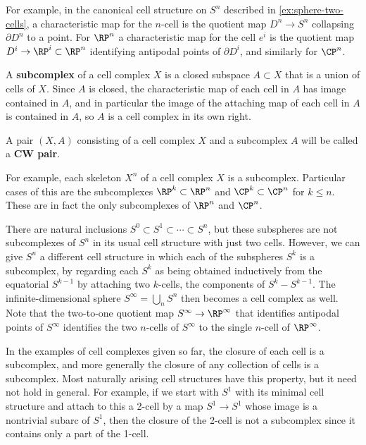 For example, in the canonical cell structure on $S^n$ described in
\cref{ex:sphere-two-cells}, a characteristic map for the $n$-cell is the quotient map
$D^n \to S^n$ collapsing $\partial D^n$ to a point. For $\RP^n$ a characteristic map for the cell
$e^i$ is the quotient map $D^i \to \RP^i \subset \RP^n$ identifying antipodal points of
$\partial D^i$, and similarly for $\CP^n$.

\begin{definition}[Subcomplex]
\label{def:subcomplex}
\mathlibok
{}
A \textbf{subcomplex} of a cell complex $X$ is a closed subspace $A \subset X$ that is a
union of cells of $X$. Since $A$ is closed, the characteristic map of each cell in $A$ has
image contained in $A$, and in particular the image of the attaching map of each cell
in $A$ is contained in $A$, so $A$ is a cell complex in its own right.
\end{definition}

\begin{definition}[CW pair]
\label{def:cw-pair}
\mathlibok
{}
A pair $(X,A)$ consisting of a cell complex $X$ and a subcomplex $A$ will be
called a \textbf{CW pair}.
\end{definition}

For example, each skeleton $X^n$ of a cell complex $X$ is a subcomplex. Particular
cases of this are the subcomplexes $\RP^k \subset \RP^n$ and $\CP^k \subset \CP^n$ for $k \le n$. These
are in fact the only subcomplexes of $\RP^n$ and $\CP^n$.

There are natural inclusions $S^0 \subset S^1 \subset \cdots \subset S^n$, but these subspheres
are not subcomplexes of $S^n$ in its usual cell structure with just two cells. However, we
can give $S^n$ a different cell structure in which each of the subspheres $S^k$ is a
subcomplex, by regarding each $S^k$ as being obtained inductively from the equatorial
$S^{k-1}$ by attaching two $k$-cells, the components of $S^k - S^{k-1}$. The infinite-dimensional
sphere $S^\infty = \bigcup_n S^n$ then becomes a cell complex as well. Note that the two-to-one
quotient map $S^\infty \to \RP^\infty$ that identifies antipodal points of $S^\infty$ identifies the two
$n$-cells of $S^\infty$ to the single $n$-cell of $\RP^\infty$.

\begin{remark}
\label{rem:closure-of-cell-not-always-subcomplex}
In the examples of cell complexes given so far, the closure of each cell is a
subcomplex, and more generally the closure of any collection of cells is a subcomplex.
Most naturally arising cell structures have this property, but it need not hold in
general. For example, if we start with $S^1$ with its minimal cell structure and attach
to this a 2-cell by a map $S^1 \to S^1$ whose image is a nontrivial subarc of $S^1$, then
the closure of the 2-cell is not a subcomplex since it contains only a part of the 1-cell.
\end{remark}

